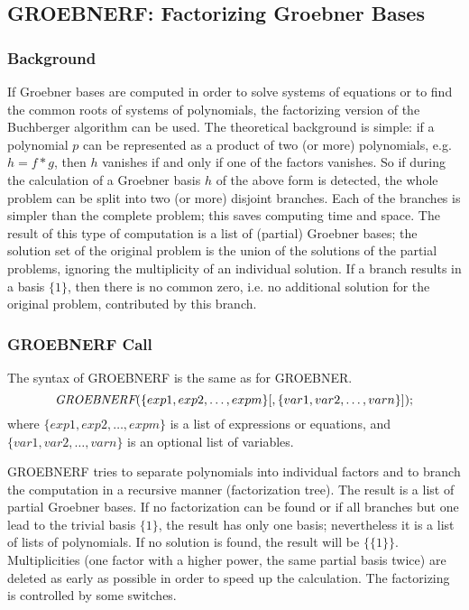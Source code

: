 \subsection{GROEBNERF: Factorizing Groebner Bases}

\subsubsection{Background}
If Groebner bases are computed in order to solve systems of
equations or to find the common roots of systems of polynomials,
the factorizing version of the Buchberger algorithm can be used.
The theoretical background is simple: if a polynomial $p$ can be
represented as a product of two (or more) polynomials, e.g. $h= f*g$,
then $h$ vanishes if and only if one of the factors vanishes. So if
during the calculation of a Groebner basis $h$ of the above form is
detected, the whole problem can be split into two (or more)
disjoint branches. Each of the branches is simpler than the complete
problem; this saves computing time and space. The result of this
type of computation is a list of (partial) Groebner bases; the
solution set of the original problem is the union of the solutions of
the partial problems, ignoring the multiplicity of an individual
solution. If a branch results in a basis $\{1\}$, then there is no
common zero, i.e. no additional solution for the original problem,
contributed by this branch.

\subsubsection{GROEBNERF Call}
The syntax of GROEBNERF is the same as for GROEBNER.
\[
\mbox{\it GROEBNERF}(\{exp1, exp2, \ldots , expm\}[,\{var1, var2,
\ldots , varn\}]);
\]
where $\{exp1, exp2, \ldots , expm\} $ is a list of expressions or
equations, \linebreak[4] and $\{var1, var2,\ldots , varn\}$ is an
optional list of variables.

GROEBNERF tries to separate polynomials into individual factors and
to branch the computation in a recursive manner (factorization tree).
The result is a list of partial Groebner bases. If no factorization can
be found or if all branches but one lead to the trivial basis $\{1\}$,
the result has only one basis; nevertheless it is a list of lists of
polynomials. If no solution is found, the result will be $\{\{1\}\}$.
Multiplicities (one factor with a higher power, the same partial basis
twice) are deleted as early as possible in order to speed up the
calculation. The factorizing is controlled by some switches.

